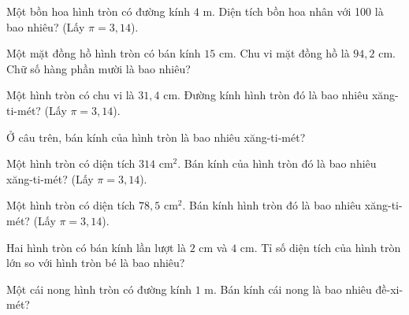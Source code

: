 \begin{ex}
  Một bồn hoa hình tròn có đường kính $4\text{ m}$. Diện tích bồn hoa nhân với 100 là bao nhiêu? (Lấy $\pi = 3{,}14$).
\end{ex}

\begin{ex}
  Một mặt đồng hồ hình tròn có bán kính $15\text{ cm}$. Chu vi mặt đồng hồ là $94{,}2\text{ cm}$. Chữ số hàng phần mười là bao nhiêu?
\end{ex}

\begin{ex}
  Một hình tròn có chu vi là $31{,}4\text{ cm}$. Đường kính hình tròn đó là bao nhiêu xăng-ti-mét? (Lấy $\pi = 3{,}14$).
\end{ex}

\begin{ex}
  Ở câu trên, bán kính của hình tròn là bao nhiêu xăng-ti-mét?
\end{ex}

\begin{ex}
  Một hình tròn có diện tích $314\text{ cm}^2$. Bán kính của hình tròn đó là bao nhiêu xăng-ti-mét? (Lấy $\pi = 3{,}14$).
\end{ex}

\begin{ex}
  Một hình tròn có diện tích $78{,}5\text{ cm}^2$. Bán kính hình tròn đó là bao nhiêu xăng-ti-mét? (Lấy $\pi = 3{,}14$).
\end{ex}

\begin{ex}
  Hai hình tròn có bán kính lần lượt là $2\text{ cm}$ và $4\text{ cm}$. Tỉ số diện tích của hình tròn lớn so với hình tròn bé là bao nhiêu?
\end{ex}

\begin{ex}
  Một cái nong hình tròn có đường kính $1\text{ m}$. Bán kính cái nong là bao nhiêu đề-xi-mét?
\end{ex}

